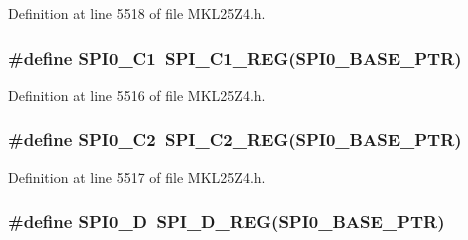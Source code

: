 Definition at line 5518 of file M\+K\+L25\+Z4.\+h.

\subsubsection[{\texorpdfstring{S\+P\+I0\+\_\+\+C1}{SPI0_C1}}]{\setlength{\rightskip}{0pt plus 5cm}\#define S\+P\+I0\+\_\+\+C1~{\bf S\+P\+I\+\_\+\+C1\+\_\+\+R\+EG}({\bf S\+P\+I0\+\_\+\+B\+A\+S\+E\+\_\+\+P\+TR})}\hypertarget{group___s_p_i___register___accessor___macros_ga2b777381f1ec71e064b9de35c6dd8dd1}{}\label{group___s_p_i___register___accessor___macros_ga2b777381f1ec71e064b9de35c6dd8dd1}


Definition at line 5516 of file M\+K\+L25\+Z4.\+h.

\subsubsection[{\texorpdfstring{S\+P\+I0\+\_\+\+C2}{SPI0_C2}}]{\setlength{\rightskip}{0pt plus 5cm}\#define S\+P\+I0\+\_\+\+C2~{\bf S\+P\+I\+\_\+\+C2\+\_\+\+R\+EG}({\bf S\+P\+I0\+\_\+\+B\+A\+S\+E\+\_\+\+P\+TR})}\hypertarget{group___s_p_i___register___accessor___macros_gaead596270d47a58d92c5c7f9ca5bb712}{}\label{group___s_p_i___register___accessor___macros_gaead596270d47a58d92c5c7f9ca5bb712}


Definition at line 5517 of file M\+K\+L25\+Z4.\+h.

\subsubsection[{\texorpdfstring{S\+P\+I0\+\_\+D}{SPI0_D}}]{\setlength{\rightskip}{0pt plus 5cm}\#define S\+P\+I0\+\_\+D~{\bf S\+P\+I\+\_\+\+D\+\_\+\+R\+EG}({\bf S\+P\+I0\+\_\+\+B\+A\+S\+E\+\_\+\+P\+TR})}\hypertarget{group___s_p_i___register___accessor___macros_gaf107ad269ab195b7a570b3fb61a3e402}{}\label{group___s_p_i___register___accessor___macros_gaf107ad269ab195b7a570b3fb61a3e402}


